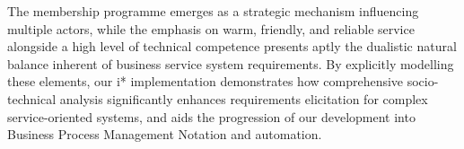 \documentclass[14pt,a4paper]{article}
\begin{document}
The membership programme emerges as a strategic mechanism influencing multiple actors, while the emphasis on warm, friendly, and reliable service alongside a high level of technical competence presents aptly the dualistic natural balance inherent of business service system requirements. By explicitly modelling these elements, our i* implementation demonstrates how comprehensive socio-technical analysis significantly enhances requirements elicitation for complex service-oriented systems, and aids the progression of our development into Business Process Management Notation and automation.

\newpage

\printbibliography
\end{document}
